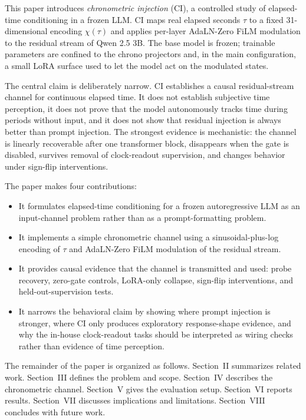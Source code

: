 \documentclass[conference,10pt]{IEEEtran}
\newcommand{\CI}{\textsc{CI}}
\newcommand{\Tau}{\tau}
\begin{document}
This paper introduces \emph{chronometric injection} (\CI), a controlled study of elapsed-time conditioning in a frozen LLM. \CI{} maps real elapsed seconds $\Tau$ to a fixed 31-dimensional encoding $\chi(\Tau)$ and applies per-layer AdaLN-Zero FiLM modulation to the residual stream of Qwen 2.5 3B. The base model is frozen; trainable parameters are confined to the chrono projectors and, in the main configuration, a small LoRA surface used to let the model act on the modulated states.

The central claim is deliberately narrow. \CI{} establishes a causal residual-stream channel for continuous elapsed time. It does not establish subjective time perception, it does not prove that the model autonomously tracks time during periods without input, and it does not show that residual injection is always better than prompt injection. The strongest evidence is mechanistic: the channel is linearly recoverable after one transformer block, disappears when the gate is disabled, survives removal of clock-readout supervision, and changes behavior under sign-flip interventions.

The paper makes four contributions:
\begin{itemize}
  \item It formulates elapsed-time conditioning for a frozen autoregressive LLM as an input-channel problem rather than as a prompt-formatting problem.
  \item It implements a simple chronometric channel using a sinusoidal-plus-log encoding of $\Tau$ and AdaLN-Zero FiLM modulation of the residual stream.
  \item It provides causal evidence that the channel is transmitted and used: probe recovery, zero-gate controls, LoRA-only collapse, sign-flip interventions, and held-out-supervision tests.
  \item It narrows the behavioral claim by showing where prompt injection is stronger, where \CI{} only produces exploratory response-shape evidence, and why the in-house clock-readout tasks should be interpreted as wiring checks rather than evidence of time perception.
\end{itemize}

The remainder of the paper is organized as follows. Section~II summarizes related work. Section~III defines the problem and scope. Section~IV describes the chronometric channel. Section~V gives the evaluation setup. Section~VI reports results. Section~VII discusses implications and limitations. Section~VIII concludes with future work.
\end{document}
